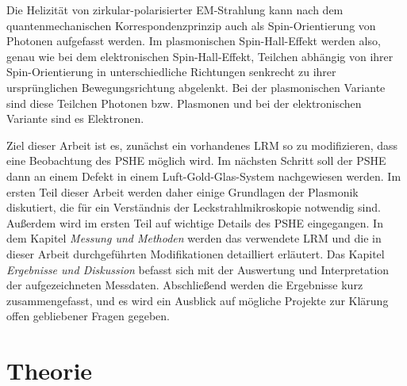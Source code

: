 \documentclass[a4paper, titlepage,  ngerman, fullpage]{book}
\begin{document}
	Die Helizität von zirkular-polarisierter EM-Strahlung kann nach dem quantenmechanischen Korrespondenzprinzip auch als Spin-Orientierung von Photonen aufgefasst werden.	Im plasmonischen Spin-Hall-Effekt werden also, genau wie bei dem elektronischen Spin-Hall-Effekt, Teilchen abhängig von ihrer Spin-Orientierung in unterschiedliche Richtungen senkrecht zu ihrer ursprünglichen Bewegungsrichtung abgelenkt. Bei der plasmonischen Variante sind diese Teilchen Photonen bzw. Plasmonen und bei der elektronischen Variante sind es Elektronen. \cite{Inoue.2005}
	
	Ziel dieser Arbeit ist es, zunächst ein vorhandenes LRM so zu modifizieren, dass eine Beobachtung des PSHE möglich wird. Im nächsten Schritt soll der PSHE dann an einem Defekt in einem Luft-Gold-Glas-System nachgewiesen werden. Im ersten Teil dieser Arbeit werden daher einige Grundlagen der Plasmonik diskutiert, die für ein Verständnis der Leckstrahlmikroskopie notwendig sind. Außerdem wird im ersten Teil auf wichtige Details des PSHE eingegangen. In dem Kapitel \textit{Messung und Methoden} werden das verwendete LRM und die in dieser Arbeit durchgeführten Modifikationen detailliert erläutert. Das Kapitel \textit{Ergebnisse und Diskussion} befasst sich mit der Auswertung und Interpretation der aufgezeichneten Messdaten. Abschließend werden die Ergebnisse kurz zusammengefasst, und es wird ein Ausblick auf mögliche Projekte zur Klärung offen gebliebener Fragen gegeben.
	
	\newpage	
	\chapter{Theorie}
\end{document}
